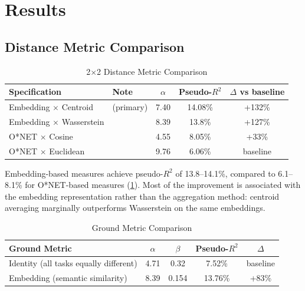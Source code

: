 \documentclass[12pt]{article}
\begin{document}
\section{Results}
\label{sec:results}


\subsection{Distance Metric Comparison}
\label{subsec:geometry-comparison}


\begin{table}[h!]
\centering
\caption{2$\times$2 Distance Metric Comparison}
\label{tab:2x2-comparison}
\begin{tabular}{llccc}
\toprule
\textbf{Specification} & \textbf{Note} & $\alpha$ & Pseudo-$R^2$ & $\Delta$ vs baseline \\
\midrule
Embedding $\times$ Centroid & (primary) & 7.40 & 14.08\% & +132\% \\
Embedding $\times$ Wasserstein & & 8.39 & 13.8\% & +127\% \\
O*NET $\times$ Cosine & & 4.55 & 8.05\% & +33\% \\
O*NET $\times$ Euclidean & & 9.76 & 6.06\% & baseline \\
\bottomrule
\end{tabular}
\end{table}


Embedding-based measures achieve pseudo-$R^2$ of 13.8--14.1\%, compared to 6.1--8.1\% for O*NET-based measures (\cref{tab:2x2-comparison}). Most of the improvement is associated with the embedding representation rather than the aggregation method: centroid averaging marginally outperforms Wasserstein on the same embeddings.


\begin{table}[h!]
\centering
\caption{Ground Metric Comparison}
\label{tab:ground-metric}
\begin{tabular}{lcccc}
\toprule
\textbf{Ground Metric} & $\alpha$ & $\beta$ & Pseudo-$R^2$ & $\Delta$ \\
\midrule
Identity (all tasks equally different) & 4.71 & 0.32 & 7.52\% & baseline \\
Embedding (semantic similarity) & 8.39 & 0.154 & 13.76\% & +83\% \\
\bottomrule
\end{tabular}
\end{table}
\end{document}
